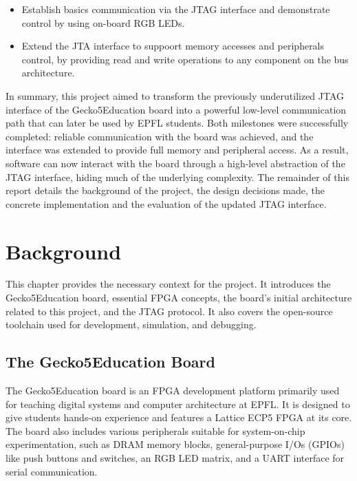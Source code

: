 \documentclass[a4paper,11pt,oneside]{report}
\newcommand{\boardName}{Gecko5Education \xspace}
\begin{document}
\begin{itemize}
    \item Establish basics communication via the JTAG interface and demonstrate control by using 
    on-board RGB LEDs.
    \item Extend the JTA interface to suppoort memory accesses and peripherals control, by providing read and write
    operations to any component on the bus architecture.
\end{itemize}

In summary, this project aimed to transform the previously underutilized JTAG interface of the \boardName board into a powerful low-level communication path
that can later be used by EPFL students. 
Both milestones were successfully completed: reliable communication with the board was achieved, 
and the interface was extended to provide full memory and peripheral access. As a result, 
software can now interact with the board through a high-level abstraction of the JTAG interface, hiding much of the underlying complexity.
The remainder of this report details the background of the project, the design decisions made, the concrete implementation and the evaluation of the updated JTAG interface.


\chapter{Background}

This chapter provides the necessary context for the project.  
It introduces the \boardName board, essential FPGA concepts,  
the board’s initial architecture related to this project, and the JTAG protocol.  
It also covers the open-source toolchain used for development,  
simulation, and debugging.  

\section{The \boardName Board}
\label{sec:board}

The \boardName board is an FPGA development platform primarily  
used for teaching digital systems and computer architecture at EPFL.  
It is designed to give students hands-on experience and features  
a Lattice ECP5 FPGA at its core.  
The board also includes various peripherals suitable for system-on-chip experimentation,  
such as DRAM memory blocks, general-purpose I/Os (GPIOs) like push buttons and switches,  
an RGB LED matrix, and a UART interface for serial communication.  
\end{document}
